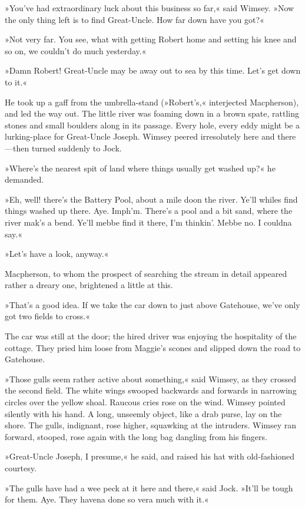 »You've had extraordinary luck about this business so far,« said Wimsey. »Now the only thing left is to find Great-Uncle. How far down have you got?«

»Not very far. You see, what with getting Robert home and setting his knee and so on, we couldn't do much yesterday.«

»Damn Robert! Great-Uncle may be away out to sea by this time. Let's get down to it.«

He took up a gaff from the umbrella-stand (»Robert's,« interjected Macpherson), and led the way out. The little river was foaming down in a brown spate, rattling stones and small boulders along in its passage. Every hole, every eddy might be a lurking-place for Great-Uncle Joseph. Wimsey peered irresolutely here and there—then turned suddenly to Jock.

»Where's the nearest spit of land where things usually get washed up?« he demanded.

»Eh, well! there's the Battery Pool, about a mile doon the river. Ye'll whiles find things washed up there. Aye. Imph'm. There's a pool and a bit sand, where the river mak's a bend. Ye'll mebbe find it there, I'm thinkin'. Mebbe no. I couldna say.«

»Let's have a look, anyway.«

Macpherson, to whom the prospect of searching the stream in detail appeared rather a dreary one, brightened a little at this.

»That's a good idea. If we take the car down to just above Gatehouse, we've only got two fields to cross.«

The car was still at the door; the hired driver was enjoying the hospitality of the cottage. They pried him loose from Maggie's scones and slipped down the road to Gatehouse.

»Those gulls seem rather active about something,« said Wimsey, as they crossed the second field. The white wings swooped backwards and forwards in narrowing circles over the yellow shoal. Raucous cries rose on the wind. Wimsey pointed silently with his hand. A long, unseemly object, like a drab purse, lay on the shore. The gulls, indignant, rose higher, squawking at the intruders. Wimsey ran forward, stooped, rose again with the long bag dangling from his fingers.

»Great-Uncle Joseph, I presume,« he said, and raised his hat with old-fashioned courtesy.

»The gulls have had a wee peck at it here and there,« said Jock. »It'll be tough for them. Aye. They havena done so vera much with it.«

